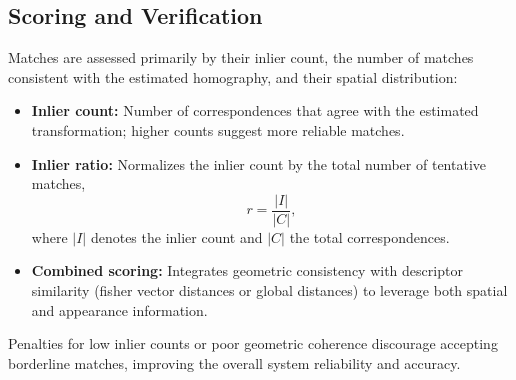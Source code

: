 \subsection{Scoring and Verification}
Matches are assessed primarily by their inlier count, the number of matches consistent with the estimated homography, and their spatial distribution:

    \begin{itemize}
        \item \textbf{Inlier count:} Number of correspondences that agree with the estimated transformation; higher counts suggest more reliable matches.
        \item \textbf{Inlier ratio: } Normalizes the inlier count by the total number of tentative matches,
  $$
  r = \frac{|I|}{|C|},
  $$
  where $|I|$ denotes the inlier count and $|C|$ the total correspondences.
        \item \textbf{Combined scoring:} Integrates geometric consistency with descriptor similarity (fisher vector distances or global distances) to leverage both spatial and appearance information.
    \end{itemize}
Penalties for low inlier counts or poor geometric coherence discourage accepting borderline matches, improving the overall system reliability and accuracy.
